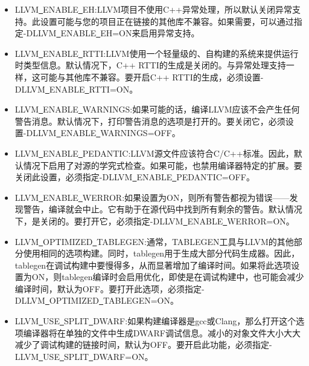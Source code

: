 \begin{itemize}
\item LLVM\underline{~}ENABLE\underline{~}EH:LLVM项目不使用C++异常处理，所以默认关闭异常支持。此设置可能与您的项目正在链接的其他库不兼容。如果需要，可以通过指定-DLLVM\underline{~}ENABLE\underline{~}EH=ON来启用异常支持。
	
\item LLVM\underline{~}ENABLE\underline{~}RTTI:LLVM使用一个轻量级的、自构建的系统来提供运行时类型信息。默认情况下，C++ RTTI的生成是关闭的。与异常处理支持一样，这可能与其他库不兼容。要开启C++ RTTI的生成，必须设置-DLLVM\underline{~}ENABLE\underline{~}RTTI=ON。
	
\item LLVM\underline{~}ENABLE\underline{~}WARNINGS:如果可能的话，编译LLVM应该不会产生任何警告消息。默认情况下，打印警告消息的选项是打开的。要关闭它，必须设置-DLLVM\underline{~}ENABLE\underline{~}WARNINGS\allowbreak =OFF。
	
\item LLVM\underline{~}ENABLE\underline{~}PEDANTIC:LLVM源文件应该符合C/C++标准。因此，默认情况下启用了对源的学究式检查。如果可能，也禁用编译器特定的扩展。要关闭此设置，必须指定-DLLVM\underline{~}\allowbreak ENABLE\underline{~}PEDANTIC=OFF。
	
\item LLVM\underline{~}ENABLE\underline{~}WERROR:如果设置为ON，则所有警告都视为错误——发现警告，编译就会中止。它有助于在源代码中找到所有剩余的警告。默认情况下，是关闭的。要打开它，必须指定-DLLVM\underline{~}ENABLE\underline{~}WERROR=ON。
	
\item LLVM\underline{~}OPTIMIZED\underline{~}TABLEGEN:通常，TABLEGEN工具与LLVM的其他部分使用相同的选项构建。同时，tablegen用于生成大部分代码生成器。因此，tablegen在调试构建中要慢得多，从而显著增加了编译时间。如果将此选项设置为ON，则tablegen编译时会启用优化，即使是在调试构建中，也可能会减少编译时间，默认为OFF。要打开此选项，必须指定-DLLVM\underline{~}OPTIMIZED\underline{~}TABLEGEN=ON。
	
\item LLVM\underline{~}USE\underline{~}SPLIT\underline{~}DWARF:如果构建编译器是gcc或Clang，那么打开这个选项编译器将在单独的文件中生成DWARF调试信息。减小的对象文件大小大大减少了调试构建的链接时间，默认为OFF。要开启此功能，必须指定-LLVM\underline{~}USE\underline{~}SPLIT\underline{~}DWARF=ON。

\end{itemize}

